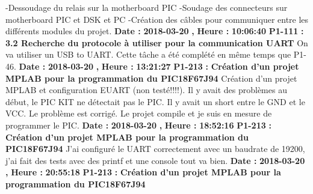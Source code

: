 \documentclass{article}%
\begin{document}
\newline%
%
{-}Dessoudage du relais sur la motherboard PIC\newline%
{-}Soudage des connecteurs sur motherboard PIC et DSK et PC\newline%
{-}Création des câbles pour communiquer entre les différents modules du projet.\newline%
\newline%
%
\textbf{Date : }%
\textbf{2018{-}03{-}20}%
\textbf{,}%
\textbf{ Heure : }%
\textbf{10:06:40}%
\newline%
%
\textbf{P1{-}111 }%
\textbf{ : }%
\textbf{ 3.2 Recherche du protocole à utiliser pour la communication UART}%
\newline%
\newline%
%
On va utiliser un USB to UART. Cette tâche a été complété en même temps que P1{-}46.\newline%
\newline%
%
\textbf{Date : }%
\textbf{2018{-}03{-}20}%
\textbf{,}%
\textbf{ Heure : }%
\textbf{13:21:27}%
\newline%
%
\textbf{P1{-}213 }%
\textbf{ : }%
\textbf{ Création d'un projet MPLAB pour la programmation du PIC18F67J94}%
\newline%
\newline%
%
Création d'un projet MPLAB et configuration EUART (non testé!!!!). Il y avait des problèmes au début, le PIC KIT ne détectait pas le PIC. Il y avait un short entre le GND et le VCC. Le problème est corrigé. Le projet compile et je suis en mesure de programmer le PIC.\newline%
\newline%
%
\textbf{Date : }%
\textbf{2018{-}03{-}20}%
\textbf{,}%
\textbf{ Heure : }%
\textbf{18:52:16}%
\newline%
%
\textbf{P1{-}213 }%
\textbf{ : }%
\textbf{ Création d'un projet MPLAB pour la programmation du PIC18F67J94}%
\newline%
\newline%
%
J'ai configuré le UART correctement avec un baudrate de 19200, j'ai fait des tests avec des printf et une console tout va bien.\newline%
\newline%
%
\textbf{Date : }%
\textbf{2018{-}03{-}20}%
\textbf{,}%
\textbf{ Heure : }%
\textbf{20:55:18}%
\newline%
%
\textbf{P1{-}213 }%
\textbf{ : }%
\textbf{ Création d'un projet MPLAB pour la programmation du PIC18F67J94}%
\newline%
\newline%
\end{document}
